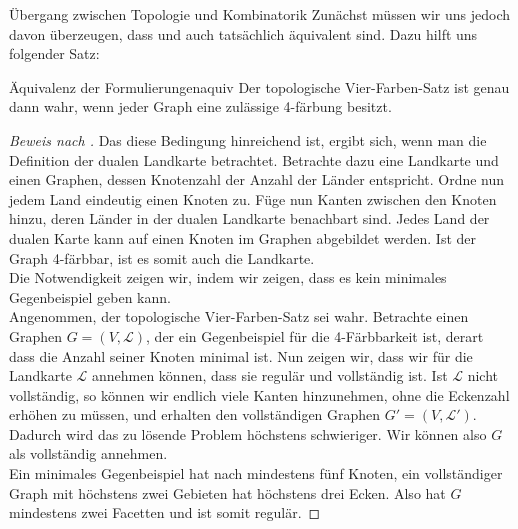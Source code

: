 \begin{chapter}{Übergang zwischen Topologie und Kombinatorik}
 Zunächst müssen wir uns jedoch davon überzeugen, dass  und  auch tatsächlich äquivalent sind. Dazu hilft uns folgender Satz:
 
 \begin{satzl}{Äquivalenz der Formulierungen}{aquiv}
  Der topologische Vier-Farben-Satz ist genau dann wahr, wenn jeder Graph eine zulässige 4-färbung besitzt.
 \end{satzl}
 \begin{proof}[Beweis nach \cite{fritsch}]
  Das diese Bedingung hinreichend ist, ergibt sich, wenn man die Definition der dualen Landkarte betrachtet. Betrachte dazu eine Landkarte und einen Graphen, dessen Knotenzahl der Anzahl der Länder entspricht. Ordne nun jedem Land eindeutig einen Knoten zu. Füge nun Kanten zwischen den Knoten hinzu, deren Länder in der dualen Landkarte benachbart sind. Jedes Land der dualen Karte kann auf einen Knoten im Graphen abgebildet werden. Ist der Graph 4-färbbar, ist es somit auch die Landkarte.\\
  Die Notwendigkeit zeigen wir, indem wir zeigen, dass es kein minimales Gegenbeispiel geben kann.\\
  Angenommen, der topologische Vier-Farben-Satz sei wahr. Betrachte einen Graphen $G=(V,\mathcal{L})$, der ein Gegenbeispiel für die 4-Färbbarkeit ist, derart dass die Anzahl seiner Knoten minimal ist. Nun zeigen wir, dass wir für die Landkarte $\mathcal{L}$ annehmen können, dass sie regulär und vollständig ist. Ist $\mathcal{L}$ nicht vollständig, so können wir endlich viele Kanten hinzunehmen, ohne die Eckenzahl erhöhen zu müssen, und erhalten den vollständigen Graphen $G' = (V,\mathcal{L}')$. Dadurch wird das zu lösende Problem höchstens schwieriger. Wir können also $G$ als vollständig annehmen. \\
  Ein minimales Gegenbeispiel hat nach  mindestens fünf Knoten, ein vollständiger Graph mit höchstens zwei Gebieten hat höchstens drei Ecken. Also hat $G$ mindestens zwei Facetten und ist somit regulär.
 \end{proof}

\end{chapter}